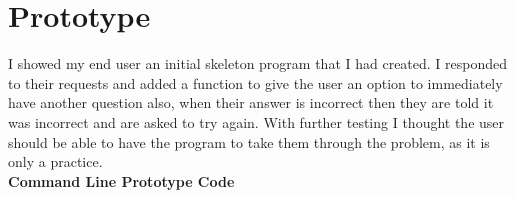 \documentclass[a4paper,12pt]{report}
\begin{document}
\bigskip


\bigskip


\bigskip

\section{Prototype}


\bigskip

I showed my end user an initial skeleton program that I had created. I responded to their requests and added a function to give the user an option to immediately have another question also, when their answer is incorrect then they are told it was incorrect and are asked to try again. With further testing I thought the user should be able to have the program to take them through the problem, as it is only a practice.\\
\textbf{Command Line Prototype Code}
\end{document}

